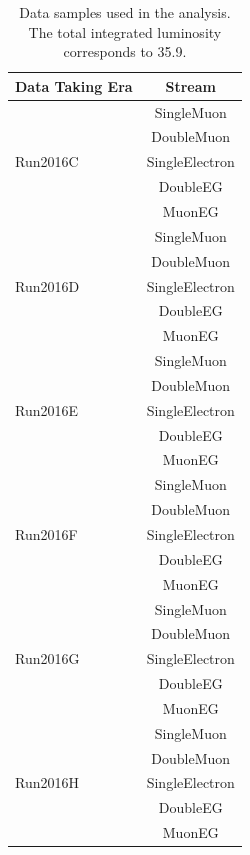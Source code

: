 \begin{table}[htbH]
\begin{center}
\begin{tabular}{@{}|l|c|@{}}
\hline
Data Taking Era & Stream\\
\hline
\multirow{5}{*}{Run2016C} 	& SingleMuon  \\
                                & DoubleMuon \\
				& SingleElectron \\
                                & DoubleEG \\
				& MuonEG \\ \hline
\multirow{5}{*}{Run2016D}       & SingleMuon  \\
                                & DoubleMuon \\
                                & SingleElectron \\
                                & DoubleEG \\
                                & MuonEG \\ \hline
\multirow{5}{*}{Run2016E}       & SingleMuon  \\
                                & DoubleMuon \\
                                & SingleElectron \\
                                & DoubleEG \\
                                & MuonEG \\ \hline
\multirow{5}{*}{Run2016F}       & SingleMuon  \\
                                & DoubleMuon \\
                                & SingleElectron \\
                                & DoubleEG \\
                                & MuonEG \\ \hline
\multirow{5}{*}{Run2016G}       & SingleMuon  \\
                                & DoubleMuon \\
                                & SingleElectron \\
                                & DoubleEG \\
                                & MuonEG \\ \hline
\multirow{5}{*}{Run2016H}       & SingleMuon  \\
                                & DoubleMuon \\
                                & SingleElectron \\
                                & DoubleEG \\
                                & MuonEG \\ \hline
\hline 
\end{tabular}
\caption{Data samples used in the analysis. The total integrated luminosity
corresponds to 35.9\fbinv.
\label{tab:data}}
\end{center}
\end{table}
%


